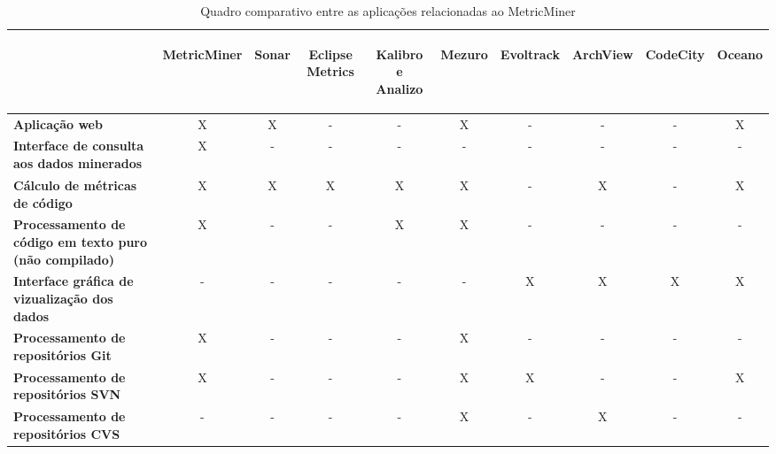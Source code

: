 \documentclass[a4paper, 12pt, twoside]{book}
\begin{document}
    \begin{table}[H]\begin{center}
        \begin{tabular}{| p{8cm} | c | c | c | c | c | c | c | c | c |}
            \hline                        
             &  \begin{sideways}\bf MetricMiner\end{sideways} & \begin{sideways}\bf Sonar\end{sideways} & \begin{sideways}\bf Eclipse Metrics\end{sideways} & \begin{sideways}\bf Kalibro e Analizo\end{sideways} & \begin{sideways}\bf Mezuro\end{sideways} & \begin{sideways}\bf Evoltrack\end{sideways} & \begin{sideways}\bf ArchView\end{sideways} & \begin{sideways}\bf CodeCity\end{sideways} & \begin{sideways}\bf Oceano\end{sideways}\\
            \hline
            \textbf{Aplicação web} & X & X & - & - & X & - & - & - & X\\
            \hline
            \textbf{Interface de consulta aos dados minerados} & X & - & - & - & - & - & - & - & -\\
            \hline
            \textbf{Cálculo de métricas de código} & X & X & X & X & X & - & X & - & X\\
            \hline
            \textbf{Processamento de código em texto puro (não compilado)} & X & - & - & X & X & - & - & - & -\\
            \hline
            \textbf{Interface gráfica de vizualização dos dados} & - & - & - & - & - & X & X & X & X\\
            \hline
            \textbf{Processamento de repositórios Git} & X & - & - & - & X & - & - & - & -\\
            \hline
            \textbf{Processamento de repositórios SVN} & X & - & - & - & X & X & - & - & X\\
            \hline
            \textbf{Processamento de repositórios CVS} & - & - & - & - & X & - & X & - & -\\
            \hline
        \end{tabular}
        \caption{Quadro comparativo entre as aplicações relacionadas ao MetricMiner \label{tab:relacionados}}
    \end{center}\end{table}
\end{document}
